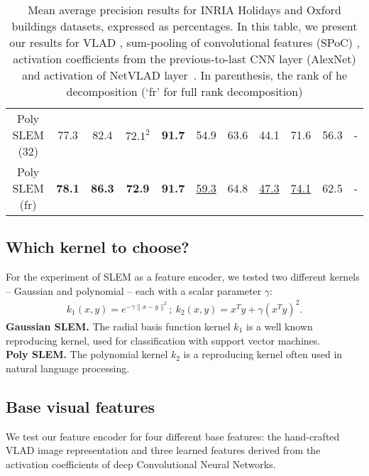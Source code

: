 \begin{table*}[t!]
\begin{center}
\begin{tabular}{c@{\hskip 1em}cccc@{\hskip 1em}cccc@{\hskip 1em}cc}
Poly SLEM (32)      & 77.3 & 82.4 & $72.1^2$ & \bf{91.7} & 54.9 & 63.6 & 44.1 & 71.6 & 56.3 & - \\
Poly SLEM   (fr)    & \bf{78.1} & \bf{86.3}  & \bf{72.9} & \bf{91.7} & \ul{59.3}  & 64.8 & \ul{47.3} & \ul{74.1} & 62.5 & - \\
\hline
\end{tabular}
\caption{Mean average precision results for INRIA Holidays and Oxford buildings datasets, expressed as percentages. In this table, we present our results for VLAD \cite{Delhumeau2013}, sum-pooling of convolutional features (SPoC) \cite{babenko15}, activation coefficients from the previous-to-last CNN layer (AlexNet) \cite{Krizhevsky2012} and activation of NetVLAD layer~\cite{Arandjelovic15}. In parenthesis, the rank of he decomposition (`fr' for full rank decomposition) }
\label{fullrank}
\end{center}
\end{table*}

\subsection{Which kernel to choose?}
For the experiment of SLEM as a feature encoder, we tested two different kernels -- Gaussian and polynomial -- each with a scalar parameter $\gamma$:
\begin{align}
    k_1(x,y) = e^{-\gamma\|x-y \|^2}; \ 
    k_2(x,y) = x^Ty+\gamma(x^Ty)^2. \label{kernels}
\end{align}
\textbf{Gaussian SLEM.} The radial basis function kernel $k_1$ is a
well known reproducing kernel, used for classification with support vector machines.\\
\textbf{Poly SLEM.} The polynomial kernel $k_2$ is a reproducing kernel often used in natural language processing.\\


\subsection{Base visual features}
We test our feature encoder for four different base features: the hand-crafted VLAD image representation and three learned features derived from the activation coefficients of deep Convolutional Neural Networks.

